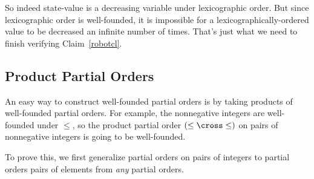 So indeed state-value is a decreasing variable under lexicographic order.
But since lexicographic order is well-founded, it is impossible for a
lexicographically-ordered value to be decreased an infinite number of
times.  That's just what we need to finish verifying Claim~\ref{robotcl}.

\iffalse
Now notice that the lexicographic order on $\naturals^3$ defined in the
previous section (by the condition~(\ref{lex3})) is exactly the same as
$\lexle$ on $\naturals^3$ according to Definition~\ref{lexn}.

But we already proved that the value of the robot's state decreases at
every step.  And we have just proved that the order on these values is
well-founded.  So Lemma~\ref{d-chain} implies that the values cannot keep
decreasing forever.  That means the robot cannot keep moving forever: it
must always terminate.
\fi

\subsection{Product Partial Orders}

An easy way to construct well-founded partial orders is by taking products
of well-founded partial orders.  For example, the nonnegative integers are
well-founded under $\leq$, so the product partial order $(\leq \cross
\leq)$ on pairs of nonnegative integers is going to be well-founded.

\iffalse

But why stop at $n$ when we can be much more general without being any more
complicated?

The idea is that a Cartesion product, $A_1 \cross A_2 \cross \dots \cross
A_n$ of sets $A_1,A_2, \dots, A_n$ consists of all the $n$-tuples
$\ang{a_1,a_2,\dots,a_n}$ such that $a_i \in A_i$ for $1 \le i \le n$.  But
any such $n$-tuple can be represented by the function $f$ where $f(i)
\eqdef a_i$.

GO ON TO DEFINE: a \emph{dependent-type} is a set-valued total function.
For example, for $r \in \reals$, define the dependent-type, $F_0$, by the
rule:
\[
F_0(r) \eqdef\ \ \set{t \in \reals \suchthat t \neq r}.
\]

If $F$ is a dependent-type, then an \emph{element of type $F$} is
defined to be a total function $f$ with the same domain as $F$ and such
that
\[
\forall a \in \domain(F)\ f(a) \in F(a).
\]

AND SO ON...
\fi

To prove this, we first generalize partial orders on pairs of integers
to partial orders pairs of elements from \emph{any} partial orders.

